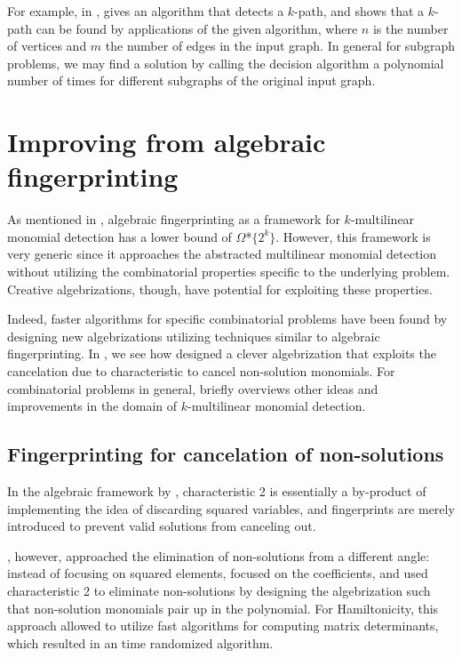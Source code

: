 For example, in \cite{Koutis08}, 
\citeauthor{Koutis08} gives an algorithm that detects a $k$-path, and shows that a 
$k$-path can be found by  applications of the given
algorithm, where $n$ is the number of vertices and $m$ the number of edges in the input graph. 
In general for subgraph problems, we may find a solution by calling the decision 
algorithm a polynomial number of times for different subgraphs of the original input graph.

\section{Improving from algebraic fingerprinting}
\label{sect:improvements}

As mentioned in , 
algebraic fingerprinting as a framework 
for $k$-multilinear monomial detection has a lower bound of $\Omega$*$\{2^k\}$. 
However, this framework is very generic since it 
approaches the abstracted multilinear monomial detection without 
utilizing the combinatorial properties specific to the underlying problem. 
Creative algebrizations, though, 
have potential for exploiting these properties.

Indeed, faster algorithms for specific combinatorial problems 
have been found by designing new algebrizations utilizing techniques 
similar to algebraic fingerprinting. In , 
we see how \textcite{Björklund14} designed a clever algebrization that  
exploits the cancelation due to characteristic to cancel non-solution monomials. 
For combinatorial problems in general, 
briefly overviews other ideas and 
improvements in the domain of $k$-multilinear monomial detection.

\subsection{Fingerprinting for cancelation of non-solutions}
\label{sect:cancel_nonsolutions}

In the algebraic framework by \citeauthor{KouWil09}, 
characteristic 2 is essentially a by-product of implementing 
the idea of discarding squared variables, and fingerprints are merely 
introduced to prevent valid solutions from canceling out.

\textcite{Björklund14}, however, approached the elimination of 
non-solutions from a different angle: instead of focusing on squared elements, 
\citeauthor{Björklund14} focused on the coefficients, 
and used characteristic 2 to eliminate non-solutions by designing 
the algebrization such that non-solution monomials pair up in the polynomial. 
For Hamiltonicity, this approach allowed \citeauthor{Björklund14} to utilize 
fast algorithms for computing matrix determinants, which resulted in an 
 time randomized algorithm.

